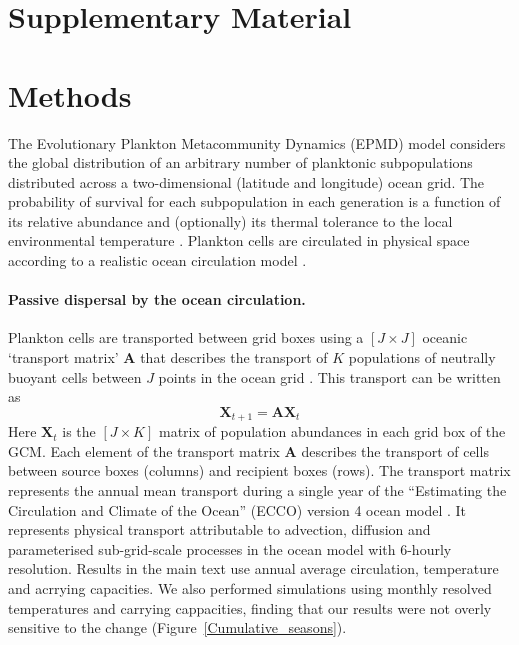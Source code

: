 \documentclass[12pt]{article}
\begin{document}
\clearpage
{}
\appendix
\renewcommand{\thesection}{SI}

\section{Supplementary Material}




\section*{Methods}

The Evolutionary Plankton Metacommunity Dynamics (EPMD) model considers the global distribution of an arbitrary number of planktonic subpopulations distributed across a two-dimensional (latitude and longitude) ocean grid. The probability of survival for each subpopulation in each generation is a function of its relative abundance and (optionally) its thermal tolerance to the local environmental temperature \citep{Cherry:2003}. Plankton cells are circulated in physical space according to a realistic ocean circulation model \citep{Forget:2015,Fukumori:2019}. 

\paragraph{Passive dispersal by the ocean circulation.}

Plankton cells are transported between grid boxes using a $[J\times J]$ oceanic `transport matrix' $\mathbf{A}$ that describes the transport of $K$ populations of neutrally buoyant cells between $J$ points in the ocean grid \citep{Khatiwala:2005}. This transport can be written as 
%
\begin{equation}
\label{ }
\mathbf{X}_{t+1} = \mathbf{A}\mathbf{X}_{t}
\end{equation}
%
Here $\mathbf{X}_t$ is the $[J\times K]$ matrix of population abundances in each grid box of the GCM. Each element of the transport matrix $\mathbf{A}$ describes the transport of cells between source boxes (columns) and recipient boxes (rows). The transport matrix represents the annual mean transport during a single year of the ``Estimating the Circulation and Climate of the Ocean'' (ECCO) version 4 ocean model \citep{Forget:2015,Fukumori:2019}. It represents physical transport attributable to advection, diffusion and parameterised sub-grid-scale processes in the ocean model with 6-hourly resolution. Results in the main text use annual average circulation, temperature and acrrying capacities. We also performed simulations using monthly resolved temperatures and carrying cappacities, finding that our results were not overly sensitive to the change (Figure~\ref{Cumulative_seasons}).
\end{document}

